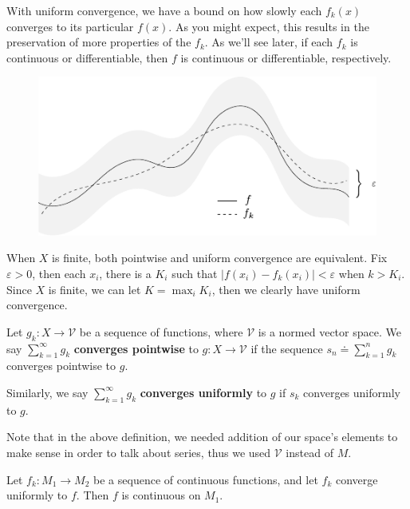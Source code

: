 \documentclass[10pt]{report}
\begin{document}
\pagebreak

With uniform convergence, we have a bound on how slowly each $f_k(x)$ converges to its particular $f(x)$. As you might expect, this results in the preservation of more properties of the $f_k$. As we'll see later, if each $f_k$ is continuous or differentiable, then $f$ is continuous or differentiable, respectively.

\begin{figure}[H]
	\centering
	\includegraphics[scale=1.3]{fig/uniform-convergence.pdf}
\end{figure}

\begin{note}[]
	When $X$ is finite, both pointwise and uniform convergence are equivalent. Fix $\varepsilon>0$, then each $x_i$, there is a $K_i$ such that $|f(x_i) - f_k(x_i) | < \varepsilon$ when $k > K_i$. Since $X$ is finite, we can let $K = \max_i K_i$, then we clearly have uniform convergence.
\end{note}

\begin{defn}[]
	Let $g_k : X \to \mathcal{V}$ be a sequence of functions, where $\mathcal{V}$ is a normed vector space. We say $\sum_{k=1}^{\infty} g_k$ \textbf{converges pointwise} to $g:X \to \mathcal{V}$ if the sequence $s_n \doteq \sum_{k=1}^{n} g_k$ converges pointwise to $g$.

	Similarly, we say $\sum_{k=1}^{\infty} g_k$ \textbf{converges uniformly} to $g$ if $s_k$ converges uniformly to $g$.
\end{defn}

Note that in the above definition, we needed addition of our space's elements to make sense in order to talk about series, thus we used $\mathcal{V}$ instead of $M$.

\begin{prop}
	Let $f_k: M_1 \to M_2$ be a sequence of continuous functions, and let $f_k$ converge uniformly to $f$. Then $f$ is continuous on $M_1$.
\end{prop}
\end{document}
